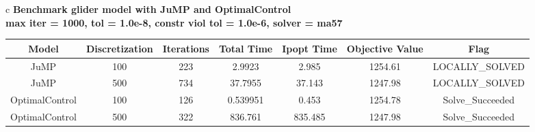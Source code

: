 \documentclass{standalone}
\begin{document}
\begin{tabular}{c}
\Large\textbf{Benchmark glider model with JuMP and OptimalControl}\\
\large\textbf{max iter = 1000, tol = 1.0e-8, constr viol tol = 1.0e-6, solver = ma57}\\
\begin{tabular}{ccccccc}
  \hline
  \textbf{Model} & \textbf{Discretization} & \textbf{Iterations} & \textbf{Total Time} & \textbf{Ipopt Time} & \textbf{Objective Value} & \textbf{Flag} \\\hline
  JuMP & 100 & 223 & 2.9923 & 2.985 & 1254.61 & LOCALLY\_SOLVED \\
  JuMP & 500 & 734 & 37.7955 & 37.143 & 1247.98 & LOCALLY\_SOLVED \\
  OptimalControl & 100 & 126 & 0.539951 & 0.453 & 1254.78 & Solve\_Succeeded \\
  OptimalControl & 500 & 322 & 836.761 & 835.485 & 1247.98 & Solve\_Succeeded \\\hline
\end{tabular}
\end{tabular}
\end{document}
